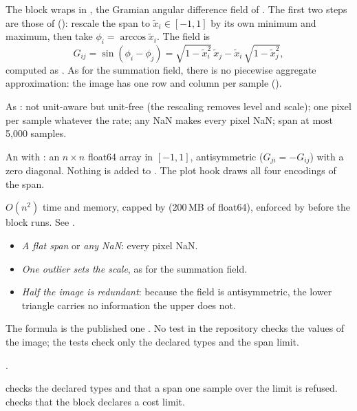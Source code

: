 The block wraps  in , the
Gramian angular difference field of \citet{wang2015imaging}. The first two steps are those
of  (): rescale the span to
$\tilde x_i \in [-1,1]$ by its own minimum and maximum, then take $\phi_i = \arccos\tilde x_i$.
The field is
\[ G_{ij} = \sin(\phi_i - \phi_j) = \sqrt{1-\tilde x_i^2}\,\tilde x_j - \tilde x_i\,\sqrt{1-\tilde x_j^2}, \]
computed as . As for the summation field, there is
no piecewise aggregate approximation: the image has one row and column per sample
().

As : not unit-aware but unit-free (the rescaling removes
level and scale); one pixel per sample whatever the rate; any NaN makes every pixel NaN;
span at most 5{,}000 samples.

An  with : an $n \times n$ float64 array in $[-1,1]$,
antisymmetric ($G_{ji} = -G_{ij}$) with a zero diagonal. Nothing is added to .
The plot hook draws all four encodings of the span.

$O(n^2)$ time and memory, capped by  (200\,MB of float64),
enforced by  before the block runs. See
.

\begin{itemize}
\item \emph{A flat span} or \emph{any NaN}: every pixel NaN.
\item \emph{One outlier sets the scale}, as for the summation field.
\item \emph{Half the image is redundant}: because the field is antisymmetric, the lower
  triangle carries no information the upper does not.
\end{itemize}

The formula is the published one \citep{wang2015imaging}. No test in the repository checks
the values of the image; the tests check only the declared types and the span limit.

\citet{wang2015imaging}.

 checks the declared types and that a span one sample
over the limit is refused.  checks that the block declares
a cost limit.
